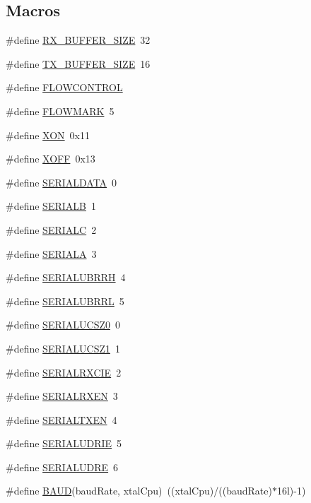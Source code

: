 \subsection*{Macros}
\begin{DoxyCompactItemize}
\item 
\#define \hyperlink{group__uart_ga739a2a1a0047c98ac1b18ecd25dac092}{R\+X\+\_\+\+B\+U\+F\+F\+E\+R\+\_\+\+S\+I\+Z\+E}~32
\item 
\#define \hyperlink{group__uart_ga9ab33647617098646990fe263600b650}{T\+X\+\_\+\+B\+U\+F\+F\+E\+R\+\_\+\+S\+I\+Z\+E}~16
\item 
\#define \hyperlink{group__uart_gaff1f07741fbe1f53f46098687f0a05e2}{F\+L\+O\+W\+C\+O\+N\+T\+R\+O\+L}
\item 
\#define \hyperlink{group__uart_gaa7907a070ef8e6d68d7d774b34eebe66}{F\+L\+O\+W\+M\+A\+R\+K}~5
\item 
\#define \hyperlink{group__uart_gacdf721774c51e08c6609e6fa8cf82cc9}{X\+O\+N}~0x11
\item 
\#define \hyperlink{group__uart_ga67fd78ae15d2b67c10d44d69a49ab1c5}{X\+O\+F\+F}~0x13
\item 
\#define \hyperlink{group__uart_gaa51318345d7d41d395a6db8484b3ffdd}{S\+E\+R\+I\+A\+L\+D\+A\+T\+A}~0
\item 
\#define \hyperlink{group__uart_gabcb483ebd1a604344646038d126a7275}{S\+E\+R\+I\+A\+L\+B}~1
\item 
\#define \hyperlink{group__uart_gaa077cc918060f1067f5c2789b9a19254}{S\+E\+R\+I\+A\+L\+C}~2
\item 
\#define \hyperlink{group__uart_gaa5bea8111e1e8e5aecf47e828e49ffd4}{S\+E\+R\+I\+A\+L\+A}~3
\item 
\#define \hyperlink{group__uart_ga6d2ad84277867c58c32694e46224f04f}{S\+E\+R\+I\+A\+L\+U\+B\+R\+R\+H}~4
\item 
\#define \hyperlink{group__uart_ga3e3151352f114d0f544991899fd442f3}{S\+E\+R\+I\+A\+L\+U\+B\+R\+R\+L}~5
\item 
\#define \hyperlink{group__uart_ga41235b09734ef60d0c12ed793fdc0851}{S\+E\+R\+I\+A\+L\+U\+C\+S\+Z0}~0
\item 
\#define \hyperlink{group__uart_gac3bc8370f2ac121887bde3b9ba8d8731}{S\+E\+R\+I\+A\+L\+U\+C\+S\+Z1}~1
\item 
\#define \hyperlink{group__uart_ga9e792f4cd909071e8714b25db70710f6}{S\+E\+R\+I\+A\+L\+R\+X\+C\+I\+E}~2
\item 
\#define \hyperlink{group__uart_ga09233c5e1f7f901ab7397e3c9cf927f2}{S\+E\+R\+I\+A\+L\+R\+X\+E\+N}~3
\item 
\#define \hyperlink{group__uart_ga9e6c7fbd3272364902664d08a1e20029}{S\+E\+R\+I\+A\+L\+T\+X\+E\+N}~4
\item 
\#define \hyperlink{group__uart_gaefb2912e438c706aafbf43ac5c89392d}{S\+E\+R\+I\+A\+L\+U\+D\+R\+I\+E}~5
\item 
\#define \hyperlink{group__uart_ga044671436e16c3dde4f4a6fa829708f2}{S\+E\+R\+I\+A\+L\+U\+D\+R\+E}~6
\item 
\#define \hyperlink{group__uart_gafccfd7d1315f0763ac404c6104883341}{B\+A\+U\+D}(baud\+Rate,  xtal\+Cpu)~((xtal\+Cpu)/((baud\+Rate)$\ast$16l)-\/1)
\end{DoxyCompactItemize}
